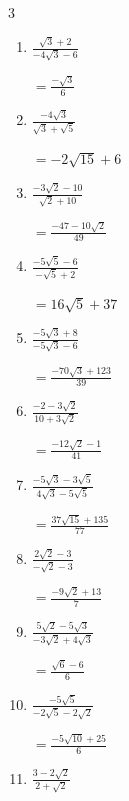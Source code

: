 \begin{multicols}{3}
\begin{enumerate}
        $\displaystyle =\frac{-5+4\sqrt{3}}{23}$

  \item $\displaystyle \frac{\sqrt{3}+2}{-4\sqrt{3}-6}$

        $\displaystyle =\frac{-\sqrt{3}}{6}$

  \item $\displaystyle \frac{-4\sqrt{3}}{\sqrt{3}+\sqrt{5}}$

        $\displaystyle =-2\sqrt{15}+6$

\columnbreak %

  \item $\displaystyle \frac{-3\sqrt{2}-10}{\sqrt{2}+10}$

        $\displaystyle =\frac{-47-10\sqrt{2}}{49}$

  \item $\displaystyle \frac{-5\sqrt{5}-6}{-\sqrt{5}+2}$

        $\displaystyle =16\sqrt{5}+37$

  \item $\displaystyle \frac{-5\sqrt{3}+8}{-5\sqrt{3}-6}$

        $\displaystyle =\frac{-70\sqrt{3}+123}{39}$

  \item $\displaystyle \frac{-2-3\sqrt{2}}{10+3\sqrt{2}}$

        $\displaystyle =\frac{-12\sqrt{2}-1}{41}$

  \item $\displaystyle \frac{-5\sqrt{3}-3\sqrt{5}}{4\sqrt{3}-5\sqrt{5}}$

        $\displaystyle =\frac{37\sqrt{15}+135}{77}$

\columnbreak %

\resetques

  \item $\displaystyle \frac{2\sqrt{2}-3}{-\sqrt{2}-3}$

        $\displaystyle =\frac{-9\sqrt{2}+13}{7}$

  \item $\displaystyle \frac{5\sqrt{2}-5\sqrt{3}}{-3\sqrt{2}+4\sqrt{3}}$

        $\displaystyle =\frac{\sqrt{6}-6}{6}$

  \item $\displaystyle \frac{-5\sqrt{5}}{-2\sqrt{5}-2\sqrt{2}}$

        $\displaystyle =\frac{-5\sqrt{10}+25}{6}$

  \item $\displaystyle \frac{3-2\sqrt{2}}{2+\sqrt{2}}$


\end{enumerate}
\end{multicols}
